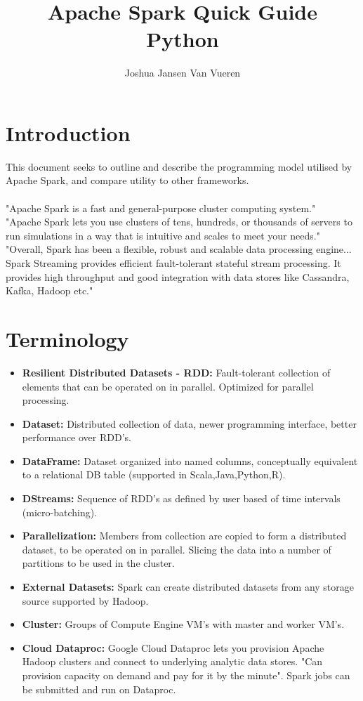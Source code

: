 \documentclass[english]{article}
\begin{document}
\title{Apache Spark Quick Guide \\
Python}


\author{Joshua Jansen Van Vueren}

\maketitle

\section*{Introduction}
This document seeks to outline and describe the programming model utilised by Apache Spark, and compare utility to other frameworks.
\\\\
"Apache Spark is a fast and general-purpose cluster computing system." 
\\
"Apache Spark lets you use clusters of tens, hundreds, or thousands of servers to run simulations in a way that is intuitive and scales to meet your needs."
\\
"Overall, Spark has been a flexible, robust and scalable data processing engine... Spark Streaming provides efficient fault-tolerant stateful stream processing. It provides high throughput and good integration with data stores like Cassandra, Kafka, Hadoop etc."
\section{Terminology}
\begin{itemize}
\item \textbf{Resilient Distributed Datasets - RDD:} Fault-tolerant collection of elements that can be operated on in parallel. Optimized for parallel processing.
\item \textbf{Dataset:} Distributed collection of data, newer programming interface, better performance over RDD's.
\item \textbf{DataFrame:} Dataset organized into named columns, conceptually equivalent to a relational DB table (supported in Scala,Java,Python,R).
\item \textbf{DStreams:} Sequence of RDD's as defined by user based of time intervals (micro-batching).
\item \textbf{Parallelization:} Members from collection are copied to form a distributed dataset, to be operated on in parallel. Slicing the data into a number of partitions to be used in the cluster.
\item \textbf{External Datasets:} Spark can create distributed datasets from any storage source supported by Hadoop.
\item \textbf{Cluster:} Groups of Compute Engine VM's with master and worker VM's.
\item \textbf{Cloud Dataproc:} Google Cloud Dataproc lets you provision Apache Hadoop clusters and connect to underlying analytic data stores. "Can provision capacity on demand and pay for it by the minute". Spark jobs can be submitted and run on Dataproc. 
\end{itemize}
\end{document}
